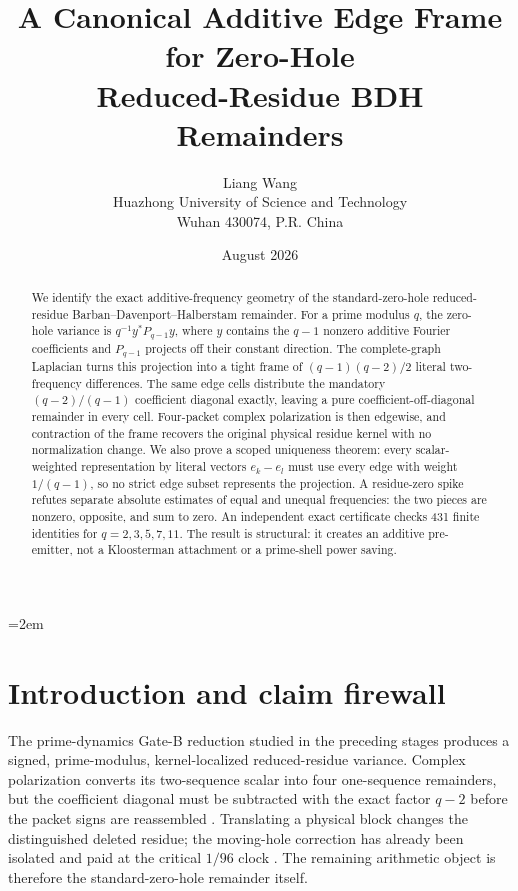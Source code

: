 \documentclass[11pt]{article}
\title{\textbf{A Canonical Additive Edge Frame for Zero-Hole\\
Reduced-Residue BDH Remainders}}
\author{Liang Wang\\
Huazhong University of Science and Technology\\
Wuhan 430074, P.R. China}
\date{August 2026}
\begin{document}
\emergencystretch=2em
\maketitle

\begin{abstract}
We identify the exact additive-frequency geometry of the standard-zero-hole
reduced-residue Barban--Davenport--Halberstam remainder.  For a prime modulus
$q$, the zero-hole variance is $q^{-1}y^*P_{q-1}y$, where $y$ contains the
$q-1$ nonzero additive Fourier coefficients and $P_{q-1}$ projects off their
constant direction.  The complete-graph Laplacian turns this projection into
a tight frame of $(q-1)(q-2)/2$ literal two-frequency differences.  The same
edge cells distribute the mandatory $(q-2)/(q-1)$ coefficient diagonal
exactly, leaving a pure coefficient-off-diagonal remainder in every cell.
Four-packet complex polarization is then edgewise, and contraction of the
frame recovers the original physical residue kernel with no normalization
change.  We also prove a scoped uniqueness theorem: every scalar-weighted
representation by literal vectors $e_k-e_l$ must use every edge with weight
$1/(q-1)$, so no strict edge subset represents the projection.  A
residue-zero spike refutes separate absolute estimates of equal and unequal
frequencies: the two pieces are nonzero, opposite, and sum to zero.  An
independent exact certificate checks 431 finite identities for
$q=2,3,5,7,11$.  The result is structural: it creates an additive
pre-emitter, not a Kloosterman attachment or a prime-shell power saving.
\end{abstract}

\section{Introduction and claim firewall}

The prime-dynamics Gate-B reduction studied in the preceding stages produces
a signed, prime-modulus, kernel-localized reduced-residue variance.  Complex
polarization converts its two-sequence scalar into four one-sequence
remainders, but the coefficient diagonal must be subtracted with the exact
factor $q-2$ before the packet signs are reassembled
\cite{Wang2026V59}.  Translating a physical block changes the distinguished
deleted residue; the moving-hole correction has already been isolated and
paid at the critical $1/96$ clock \cite{Wang2026TPC207}.  The remaining
arithmetic object is therefore the standard-zero-hole remainder itself.
\end{document}
